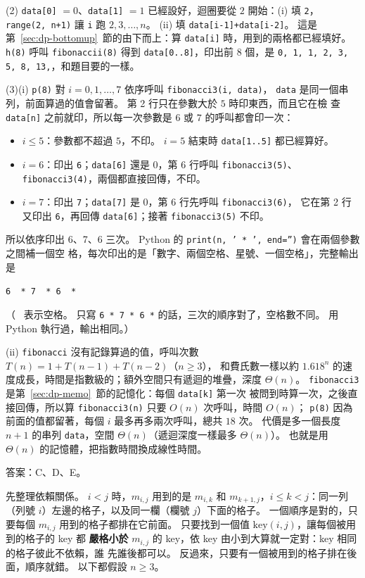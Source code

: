 (2) \texttt{data[0]} $= 0$、\texttt{data[1]} $= 1$ 已經設好，迴圈要從 $2$ 開始：(i) 填 \texttt{2}，
\texttt{range(2, n+1)} 讓 \texttt{i} 跑 $2, 3, \ldots, n$。 (ii) 填 \texttt{data[i-1]+data[i-2]}。
這是第~\ref{sec:dp-bottomup}~節的由下而上：算 \texttt{data[i]} 時，用到的兩格都已經填好。
\texttt{h(8)} 呼叫 \texttt{fibonaccii(8)} 得到 \texttt{data[0..8]}，印出前 $8$ 個，是
\texttt{0, 1, 1, 2, 3, 5, 8, 13,}，和題目要的一樣。

(3)(i) \texttt{p(8)} 對 $i = 0, 1, \ldots, 7$ 依序呼叫 \texttt{fibonacci3(i, data)}，
\texttt{data} 是同一個串列，前面算過的值會留著。 第 2 行只在參數大於 $5$ 時印東西，而且它在檢
查 \texttt{data[n]} 之前就印，所以每一次參數是 $6$ 或 $7$ 的呼叫都會印一次：
\begin{itemize}
\item $i \le 5$：參數都不超過 $5$，不印。 $i = 5$ 結束時 \texttt{data[1..5]} 都已經算好。
\item $i = 6$：印出 \texttt{6}；\texttt{data[6]} 還是 $0$，第 6 行呼叫 \texttt{fibonacci3(5)}、
\texttt{fibonacci3(4)}，兩個都直接回傳，不印。
\item $i = 7$：印出 \texttt{7}；\texttt{data[7]} 是 $0$，第 6 行先呼叫 \texttt{fibonacci3(6)}，
它在第 2 行又印出 \texttt{6}，再回傳 \texttt{data[6]}；接著 \texttt{fibonacci3(5)} 不印。
\end{itemize}
所以依序印出 6、7、6 三次。 Python 的 \texttt{print(n, ' * ', end='')} 會在兩個參數之間補一個空
格，每次印出的是「數字、兩個空格、星號、一個空格」，完整輸出是
\begin{center}
\verb*|6  * 7  * 6  * |
\end{center}
（\verb*| | 表示空格。 只寫 \texttt{6 * 7 * 6 *} 的話，三次的順序對了，空格數不同。 用 Python
執行過，輸出相同。）

(ii) \texttt{fibonacci} 沒有記錄算過的值，呼叫次數 $T(n) = 1 + T(n - 1) + T(n - 2)$（$n \ge 3$），
和費氏數一樣以約 $1.618^n$ 的速度成長，時間是指數級的；額外空間只有遞迴的堆疊，深度
$\Theta(n)$。 \texttt{fibonacci3} 是第~\ref{sec:dp-memo}~節的記憶化：每個 \texttt{data[k]} 第一次
被問到時算一次，之後直接回傳，所以算 \texttt{fibonacci3(n)} 只要 $O(n)$ 次呼叫，時間 $O(n)$；
\texttt{p(8)} 因為前面的值都留著，每個 $i$ 最多再多兩次呼叫，總共 $18$ 次。 代價是多一個長度
$n + 1$ 的串列 \texttt{data}，空間 $\Theta(n)$（遞迴深度一樣最多 $\Theta(n)$）。 也就是用
$\Theta(n)$ 的記憶體，把指數時間換成線性時間。

答案：C、D、E。

先整理依賴關係。 $i < j$ 時，$m_{i,j}$ 用到的是 $m_{i,k}$ 和 $m_{k+1,j}$，$i \le k < j$：同一列
（列號 $i$）左邊的格子，以及同一欄（欄號 $j$）下面的格子。 一個順序是對的，只要每個 $m_{i,j}$
用到的格子都排在它前面。 只要找到一個值 $\mathrm{key}(i, j)$，讓每個被用到的格子的 key 都
\textbf{嚴格小於} $m_{i,j}$ 的 key，依 key 由小到大算就一定對：key 相同的格子彼此不依賴，誰
先誰後都可以。 反過來，只要有一個被用到的格子排在後面，順序就錯。 以下都假設 $n \ge 3$。

